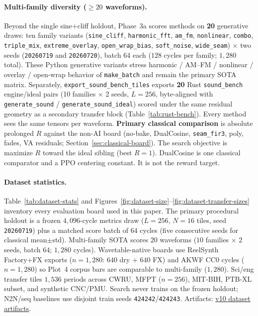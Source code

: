 \paragraph{Multi-family diversity ($\ge 20$ waveforms).}
Beyond the single sine{+}cliff holdout, Phase~3a scores methods on \textbf{20} generative draws: ten family variants (\texttt{sine\_cliff}, \texttt{harmonic\_fft}, \texttt{am\_fm}, \texttt{nonlinear}, \texttt{combo}, \texttt{triple\_mix}, \texttt{extreme\_overlay}, \texttt{open\_wrap\_bias}, \texttt{soft\_noise}, \texttt{wide\_seam}) $\times$ two seeds (\texttt{20260719} and \texttt{20260720}), batch 64 each ($128$ cycles per family; $1{,}280$ total).
These Python generative variants stress harmonic / AM--FM / nonlinear / overlay / open-wrap behavior of \texttt{make\_batch} and remain the primary SOTA matrix.
Separately, \texttt{export\_sound\_bench\_tiles} exports \textbf{20} Rust \texttt{sound\_bench} engine/ideal pairs (10 families $\times$ 2 seeds, $L{=}256$, byte-aligned with \texttt{generate\_sound} / \texttt{generate\_sound\_ideal}) scored under the same residual geometry as a secondary transfer block (Table~\ref{tab:rust-bench}).
Every method sees the same tensors per waveform.
\textbf{Primary classical comparison} is absolute prolonged $R$ against the non-AI board (no-bake, DualCosine, \texttt{seam\_fir3}, poly, fades, VA residuals; Section~\ref{sec:classical-board}).
The search objective is maximize $R$ toward the ideal sibling (best $R{=}1$).
DualCosine is one classical comparator and a PPO centering constant.
It is not the reward target.

\paragraph{Dataset statistics.}
Table~\ref{tab:dataset-stats} and Figures~\ref{fig:dataset-size}--\ref{fig:dataset-transfer-sizes} inventory every evaluation board used in this paper.
The primary procedural holdout is a frozen $4{,}096$-cycle metrics draw ($L{=}256$, $N{=}16$ tiles, seed \texttt{20260719}) plus a matched score batch of $64$ cycles (five consecutive seeds for classical mean$\pm$std).
Multi-family SOTA scores $20$ waveforms ($10$ families $\times$ $2$ seeds, batch $64$; $1{,}280$ cycles).
Wavetable-native boards use ReelSynth Factory+FX exports ($n{=}1{,}280$: $640$ dry + $640$ FX) and AKWF CC0 cycles ($n{=}1{,}280$) so Plot~4 corpus bars are comparable to multi-family ($1{,}280$).
Sci/eng transfer tiles $1{,}536$ periods across CWRU, MFPT ($n{=}256$), MIT-BIH, PTB-XL subset, and synthetic CNC/PMU.
Search never trains on the frozen holdout; N2N/seq baselines use disjoint train seeds \texttt{424242}/\texttt{424243}.
Artifacts: \href{https://github.com/reeldemo/denoise-opt-meta/tree/master/paper/Unsupervised_Wavetable_Seam_Artifact_Repair_via_Hybrid_GA-PPO_Meta-Search_v10/figures}{v10 dataset artifacts}.

